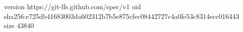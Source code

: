 version https://git-lfs.github.com/spec/v1
oid sha256:e725db41683003da602312b7b5e875cfec08442727c4a0fe53c8314ecc016443
size 43840
